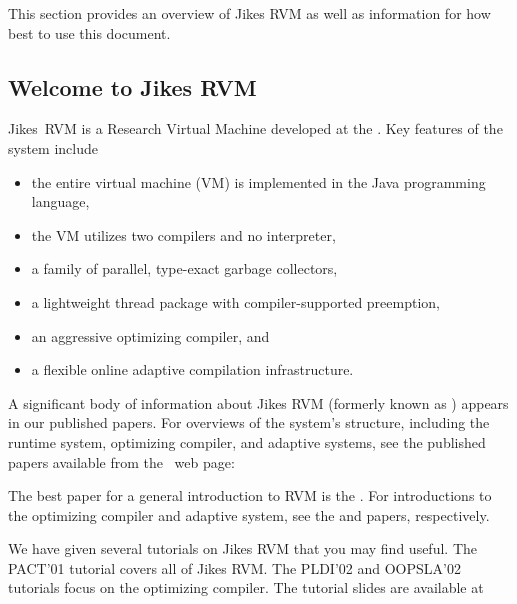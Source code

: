 This section provides an overview of Jikes RVM as well as
information for how best to use this document.

\subsection{Welcome to Jikes RVM}

Jikes\TM\ RVM is a Research Virtual Machine 
 developed at the 
.  Key
features of the system include
\begin{itemize}
\item the entire virtual machine (VM) is implemented in the
  Java\TM{} programming language,
\item the VM utilizes two compilers and no interpreter,
\item a family of parallel, type-exact garbage collectors,
\item a lightweight thread package with compiler-supported preemption,
\item an aggressive optimizing compiler, and 
\item a flexible online adaptive compilation infrastructure.
\end{itemize}

A significant body of information about Jikes RVM 
(formerly known as 
\xlink{\jp}{\JalapenoHomeURL}) appears 
in our published
papers.  For overviews of the system's structure, including the runtime system,
optimizing compiler, and adaptive systems, see the published papers
available from the \jrvm\ web page:
\begin{quote}
\xlink{{\tt \RVMPubsURL}}{\RVMPubsURL}
\end{quote}

The best paper for a general introduction to RVM is 
the 
.  
For introductions to the
optimizing compiler and adaptive system, see the 
{\JavaGrandePaperURL}
 and 
{\tt \OOPSLAPaperURL}  
papers, respectively.

We have given several tutorials on Jikes RVM that you may find
useful. The PACT'01 tutorial covers all of Jikes RVM.  The PLDI'02 and
OOPSLA'02 tutorials focus on the optimizing compiler.  The tutorial
slides are available at
\begin{quote}
\xlink{{\tt \RVMSlidesURL}}{\RVMSlidesURL}
\end{quote}


